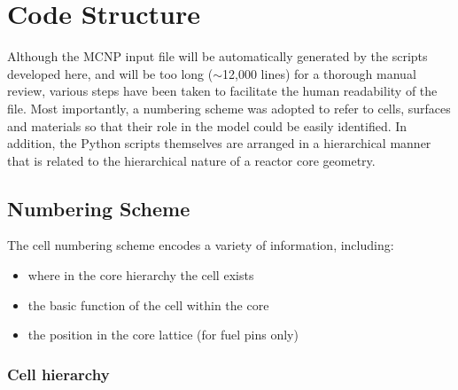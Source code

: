 \documentclass{UWNR_modeling}
\begin{document}
\section{Code Structure}\label{section:structure}

Although the MCNP input file will be automatically generated by the scripts developed here, and will be too long ($\sim$12,000 lines) for a thorough manual review, various steps have been taken to facilitate the human readability of the file.   Most importantly, a numbering scheme was adopted to refer to cells, surfaces and materials so that their role in the model could be easily identified.  In addition, the Python scripts themselves are arranged in a hierarchical manner that is related to the hierarchical nature of a reactor core geometry.

\subsection{Numbering Scheme}

The cell numbering scheme encodes a variety of information, including:
\begin{itemize}
\item where in the core hierarchy the cell exists
\item the basic function of the cell within the core
\item the position in the core lattice (for fuel pins only)
\end{itemize}

\subsubsection{Cell hierarchy}
\end{document}
